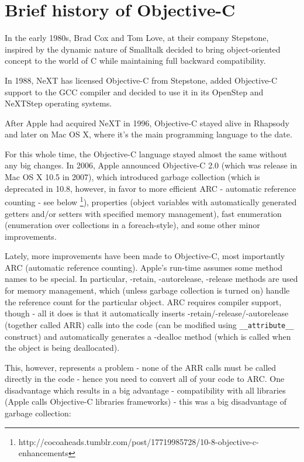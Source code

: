 \documentclass[a4paper, 11pt, fleqn]{book}
\begin{document}
\section{Brief history of Objective-C}

In the early 1980s, Brad Cox and Tom Love, at their company Stepstone, inspired by the dynamic nature of Smalltalk decided to bring object-oriented concept to the world of C while maintaining full backward compatibility.

In 1988, NeXT has licensed Objective-C from Stepstone, added Objective-C support to the GCC compiler and decided to use it in its OpenStep and NeXTStep operating systems.

After Apple had acquired NeXT in 1996, Objective-C stayed alive in Rhapsody and later on Mac OS X, where it's the main programming language to the date.

For this whole time, the Objective-C language stayed almost the same without any big changes. In 2006, Apple announced Objective-C 2.0 (which was release in Mac OS X 10.5 in 2007), which introduced garbage collection (which is deprecated in 10.8, however, in favor to more efficient ARC - automatic reference counting - see below \footnote{http://cocoaheads.tumblr.com/post/17719985728/10-8-objective-c-enhancements}), properties (object variables with automatically generated getters and/or setters with specified memory management), fast enumeration (enumeration over collections in a foreach-style), and some other minor improvements.

Lately, more improvements have been made to Objective-C, most importantly ARC (automatic reference counting). Apple's run-time assumes some method names to be special. In particular, -retain, -autorelease, -release methods are used for memory management, which (unless garbage collection is turned on) handle the reference count for the particular object. ARC requires compiler support, though - all it does is that it automatically inserts -retain/-release/-autorelease (together called ARR) calls into the code (can be modified using \verb=__attribute__= construct) and automatically generates a -dealloc method (which is called when the object is being deallocated).

This, however, represents a problem - none of the ARR calls must be called directly in the code - hence you need to convert all of your code to ARC. One disadvantage which results in a big advantage - compatibility with all libraries (Apple calls Objective-C libraries frameworks) - this was a big disadvantage of garbage collection: 
\end{document}
